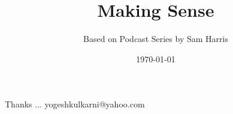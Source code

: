 \documentclass[xcolor=dvipsnames,compress,t,pdf]{beamer}
\title[Making Sense\hspace{4cm} \insertframenumber /\inserttotalframenumber]
{Making Sense}
\subtitle[]{Based on Podcast Series by Sam Harris}
\date[2021]{\today}
\begin{document}
\begin{frame}
\titlepage
\end{frame}




\begin{frame}[c]{}
Thanks ...
\vspace{5mm}
yogeshkulkarni@yahoo.com
\end{frame}
\end{document}
